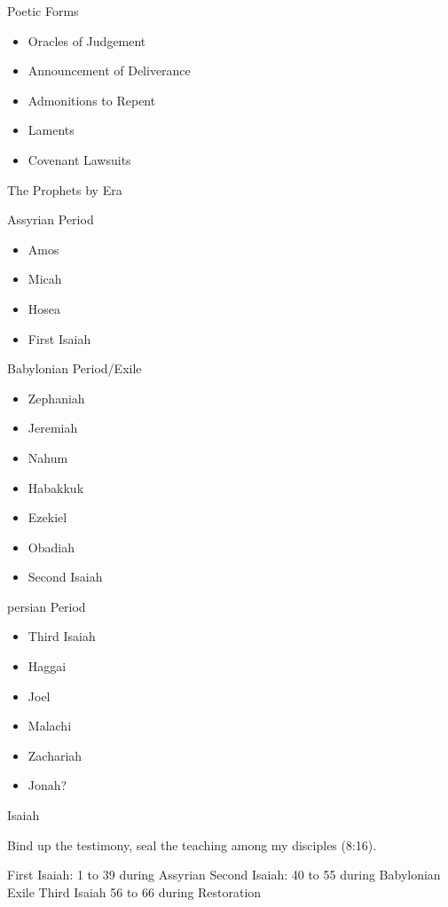\documentclass{article}
\begin{document}
    Poetic Forms

    \begin{itemize}
        \item Oracles of Judgement
        \item Announcement of Deliverance
        \item Admonitions to Repent
        \item Laments
        \item Covenant Lawsuits
    \end{itemize}

    \centerline{The Prophets by Era}

    Assyrian Period

    \begin{itemize}
        \item Amos
        \item Micah
        \item Hosea
        \item First Isaiah
    \end{itemize}

    Babylonian Period/Exile

    \begin{itemize}
        \item Zephaniah
        \item Jeremiah
        \item Nahum
        \item Habakkuk
        \item Ezekiel
        \item Obadiah
        \item Second Isaiah
    \end{itemize}

    persian Period

    \begin{itemize}
        \item Third Isaiah
        \item Haggai
        \item Joel
        \item Malachi
        \item Zachariah
        \item Jonah?
    \end{itemize}

    Isaiah

    Bind up the testimony, seal the teaching among my disciples (8:16).

    First Isaiah: 1 to 39 during Assyrian
    Second Isaiah: 40 to 55 during Babylonian Exile
    Third Isaiah 56 to 66 during Restoration
\end{document}
